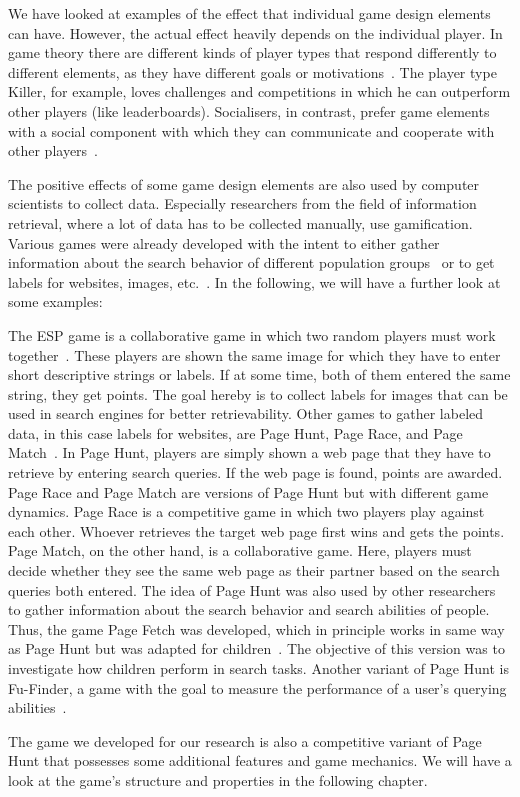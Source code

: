 We have looked at examples of the effect that individual game design elements can have. However, the actual effect heavily depends on the individual player. In game theory there are different kinds of player types that respond differently to different elements, as they have different goals or motivations~\cite{wirkungGamificationBuch}. The player type Killer, for example, loves challenges and competitions in which he can outperform other players (like leaderboards). Socialisers, in contrast, prefer game elements with a social component with which they can communicate and cooperate with other players~\cite{wirkungGamificationBuch}.\par
The positive effects of some game design elements are also used by computer scientists to collect data. Especially researchers from the field of information retrieval, where a lot of data has to be collected manually, use gamification. Various games were already developed with the intent to either gather information about the search behavior of different population groups~\cite{pageFetch1, pagefetch2, fu-finder} or to get labels for websites, images, etc.~\cite{ESPlabeling, pageHunt}. In the following, we will have a further look at some examples:\par
The ESP game is a collaborative game in which two random players must work together~\cite{ESPlabeling}. These players are shown the same image for which they have to enter short descriptive strings or labels. If at some time, both of them entered the same string, they get points. The goal hereby is to collect labels for images that can be used in search engines for better retrievability. Other games to gather labeled data, in this case labels for websites, are Page Hunt, Page Race, and Page Match~\cite{pageHunt}.
In Page Hunt, players are simply shown a web page that they have to retrieve by entering search queries. If the web page is found, points are awarded. Page Race and Page Match are versions of Page Hunt but with different game dynamics. Page Race is a competitive game in which two players play against each other. Whoever retrieves the target web page first wins and gets the points. Page Match, on the other hand, is a collaborative game. Here, players must decide whether they see the same web page as their partner based on the search queries both entered. The idea of Page Hunt was also used by other researchers to gather information about the search behavior and search abilities of people. Thus, the game Page Fetch was developed, which in principle works in same way as Page Hunt but was adapted for children~\cite{pageFetch1, pagefetch2}. The objective of this version was to investigate how children perform in search tasks. Another variant of Page Hunt is Fu-Finder, a game with the goal to measure the performance of a user's querying abilities~\cite{fu-finder}.\par
The game we developed for our research is also a competitive variant of Page Hunt that possesses some additional features and game mechanics. We will have a look at the game's structure and properties in the following chapter.